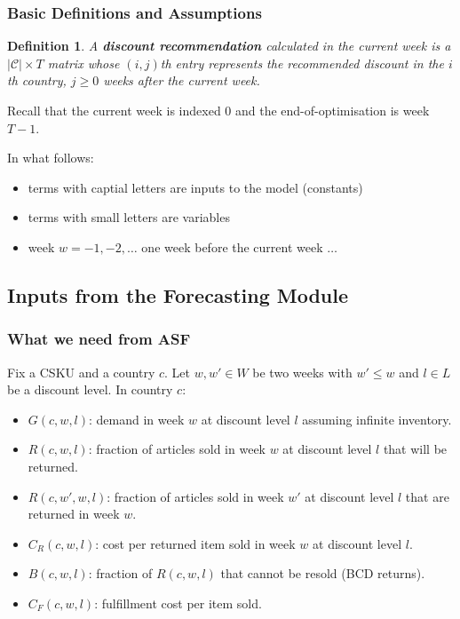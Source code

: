 \documentclass[xcolor=table]{beamer}
\newtheorem{defn}{Definition}
\begin{document}
\begin{frame}[t]
  \frametitle{Basic Definitions and Assumptions}
  \begin{defn}
  A \textcolor{orange2}{\textbf{discount recommendation}} calculated 
    in the current week is a $|\mathcal {C}| \times T$ matrix whose $(i, j)$th 
    entry represents the recommended discount in the $i$th country, 
    $j \geq 0$ weeks after the current week.
  \end{defn}

Recall that the current week is indexed $0$ and the end-of-optimisation is week
$T - 1$.

\bigskip

\pause

In what follows:
\begin{itemize}
  \item terms with captial letters are inputs to the model (constants)
  \item terms with small letters are variables
  \item week $w = -1, -2, \ldots$ one week before the current week $\ldots$ 
\end{itemize}
\end{frame}

\subsection{Inputs from the Forecasting Module}
\begin{frame}[t]
  \frametitle{What we need from ASF}
    Fix a CSKU and a country $c$. Let $w, w' \in W$ be two weeks with $w' \leq w$ and $l \in L$
    be a discount level. In country $c$: 
    \begin{itemize}
    \item $G(c, w, l)$: demand in week $w$ at discount level $l$ assuming
        infinite inventory.
    \item $R(c, w, l)$: fraction of articles sold in week $w$ at discount level $l$
        that will be returned.
      \item $R(c, w', w, l)$: fraction of articles sold in week $w'$ at discount
        level $l$ that are returned in week $w$. 
      \item $C_R(c, w, l)$: cost per returned item sold in week $w$ at discount level $l$.
      \item $B(c, w, l)$: fraction of $R(c, w, l)$ that cannot be resold (BCD
        returns).
      \item $C_F(c, w, l)$: fulfillment cost per item sold.
        \end{itemize}
\end{frame}
\end{document}
